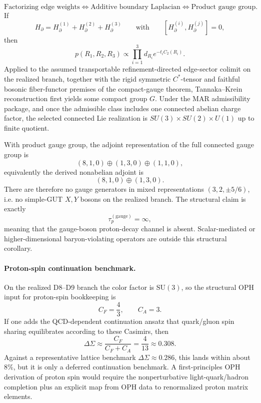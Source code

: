 \begin{theorem}
\[
\text{Factorizing edge weights}
\Longleftrightarrow
\text{Additive boundary Laplacian}
\Longleftrightarrow
\text{Product gauge group}.
\]
If
\[
H_\partial=H_\partial^{(1)}+H_\partial^{(2)}+H_\partial^{(3)}
\qquad\text{with}\qquad
[H_\partial^{(i)},H_\partial^{(j)}]=0,
\]
then
\[
p(R_1,R_2,R_3)\propto\prod_{i=1}^3 d_{R_i}e^{-t_iC_2(R_i)}.
\]
Applied to the assumed transportable refinement-directed edge-sector colimit on the realized
branch, together with the rigid symmetric
\(C^*\)-tensor and faithful bosonic fiber-functor premises of the compact-gauge theorem,
Tannaka--Krein reconstruction first yields some compact group \(G\). Under the MAR admissibility
package, and once the admissible class includes one connected abelian charge factor, the selected
connected Lie realization is \(SU(3)\times SU(2)\times U(1)\) up to finite quotient.
\end{theorem}

\begin{corollary}
With product gauge group, the adjoint representation of the full connected gauge group is
\[
(8,1,0)\oplus(1,3,0)\oplus(1,1,0),
\]
equivalently the derived nonabelian adjoint is
\[
(8,1,0)\oplus(1,3,0).
\]
There are therefore no gauge generators in mixed representations \((3,2,\pm 5/6)\), i.e. no
simple-GUT \(X,Y\) bosons on the realized branch. The structural claim is exactly
\[
\tau_p^{(\mathrm{gauge})}=\infty,
\]
meaning that the gauge-boson proton-decay channel is absent. Scalar-mediated or
higher-dimensional baryon-violating operators are outside this structural corollary.
\end{corollary}

\paragraph{Proton-spin continuation benchmark.}
On the realized D8--D9 branch the color factor is \(\mathrm{SU}(3)\), so the structural OPH
input for proton-spin bookkeeping is
\[
C_F=\frac43,
\qquad
C_A=3.
\]
If one adds the QCD-dependent continuation ansatz that quark/gluon spin sharing equilibrates
according to these Casimirs, then
\[
\Delta\Sigma\approx \frac{C_F}{C_F+C_A}=\frac{4}{13}\approx 0.308.
\]
Against a representative lattice benchmark \(\Delta\Sigma\approx 0.286\), this lands within about
\(8\%\), but it is only a deferred continuation benchmark. A first-principles OPH derivation of
proton spin would require the nonperturbative light-quark/hadron completion plus an explicit map
from OPH data to renormalized proton matrix elements.

